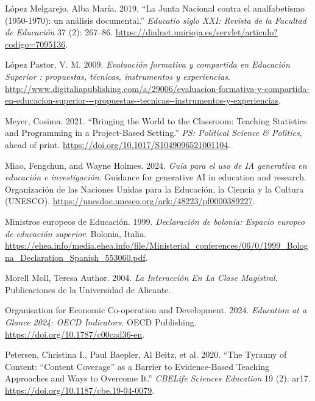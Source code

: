 \documentclass[
  11pt,
  a4paper,
  twoside]{scrreprt}
\newlength{\cslhangindent}
\newenvironment{CSLReferences}[2] %
 {\begin{list}{}{%
  \setlength{\itemindent}{0pt}
  \setlength{\leftmargin}{0pt}
  \setlength{\parsep}{0pt}
  \ifodd #1
   \setlength{\leftmargin}{\cslhangindent}
   \setlength{\itemindent}{-1\cslhangindent}
  \fi
  \setlength{\itemsep}{#2\baselineskip}}}
 {\end{list}}
\begin{document}
\begin{CSLReferences}{1}{1}
López Melgarejo, Alba María. 2019. {``La Junta Nacional contra el
analfabetismo (1950-1970): un análisis documental.''} \emph{Educatio
siglo XXI: Revista de la Facultad de Educación} 37 (2): 267--86.
\url{https://dialnet.unirioja.es/servlet/articulo?codigo=7095136}.

López Pastor, V. M. 2009. \emph{Evaluación formativa y compartida en
Educación Superior : propuestas, técnicas, instrumentos y experiencias}.
\url{http://www.digitaliapublishing.com/a/29006/evaluacion-formativa-y-compartida-en-educacion-superior---propuestas--tecnicas--instrumentos-y-experiencias}.

Meyer, Cosima. 2021. {``Bringing the World to the Classroom: Teaching
Statistics and Programming in a Project-Based Setting.''} \emph{PS:
Political Science \& Politics}, ahead of print.
\url{https://doi.org/10.1017/S1049096521001104}.

Miao, Fengchun, and Wayne Holmes. 2024. \emph{Guía para el uso de IA
generativa en educación e investigación}. Guidance for generative AI in
education and research. Organización de las Naciones Unidas para la
Educación, la Ciencia y la Cultura (UNESCO).
\url{https://unesdoc.unesco.org/ark:/48223/pf0000389227}.

Ministros europeos de Educación. 1999. \emph{Declaración de bolonia:
Espacio europeo de educación superior}. Bolonia, Italia.
\url{https://ehea.info/media.ehea.info/file/Ministerial_conferences/06/0/1999_Bologna_Declaration_Spanish_553060.pdf}.

Morell Moll, Teresa Author. 2004. \emph{La Interacción En La Clase
Magistral}. Publicaciones de la Universidad de Alicante.

Organisation for Economic Co-operation and Development. 2024.
\emph{Education at a Glance 2024: OECD Indicators}. {OECD Publishing}.
\url{https://doi.org/10.1787/c00cad36-en}.

Petersen, Christina I., Paul Baepler, Al Beitz, et al. 2020. {``The
Tyranny of Content: {``}Content Coverage{''} as a Barrier to
Evidence-Based Teaching Approaches and Ways to Overcome It.''}
\emph{CBE{\textemdash}Life Sciences Education} 19 (2): ar17.
\url{https://doi.org/10.1187/cbe.19-04-0079}.


\end{CSLReferences}
\end{document}
